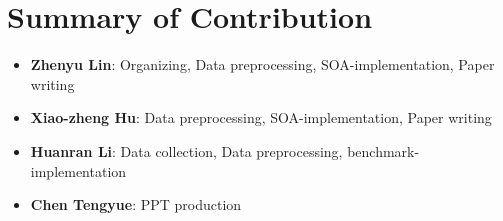 \section{Summary of Contribution}
\begin{itemize}
	\item \textbf{Zhenyu Lin}: Organizing, Data preprocessing, SOA-implementation, Paper writing
	
	\item \textbf{Xiao-zheng Hu}: Data preprocessing, SOA-implementation, Paper writing
	
	\item \textbf{Huanran Li}: Data collection, Data preprocessing, benchmark-implementation

	\item \textbf{Chen Tengyue}: PPT production
\end{itemize}